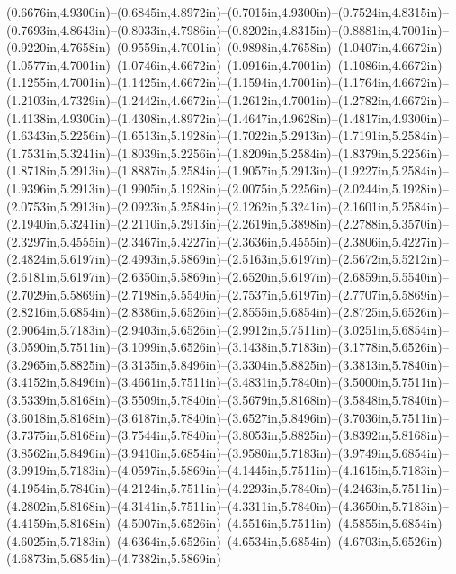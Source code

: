 (0.6676in,4.9300in)--(0.6845in,4.8972in)--(0.7015in,4.9300in)--(0.7524in,4.8315in)--(0.7693in,4.8643in)--(0.8033in,4.7986in)--(0.8202in,4.8315in)--(0.8881in,4.7001in)--(0.9220in,4.7658in)--(0.9559in,4.7001in)--(0.9898in,4.7658in)--(1.0407in,4.6672in)--(1.0577in,4.7001in)--(1.0746in,4.6672in)--(1.0916in,4.7001in)--(1.1086in,4.6672in)--(1.1255in,4.7001in)--(1.1425in,4.6672in)--(1.1594in,4.7001in)--(1.1764in,4.6672in)--(1.2103in,4.7329in)--(1.2442in,4.6672in)--(1.2612in,4.7001in)--(1.2782in,4.6672in)--(1.4138in,4.9300in)--(1.4308in,4.8972in)--(1.4647in,4.9628in)--(1.4817in,4.9300in)--(1.6343in,5.2256in)--(1.6513in,5.1928in)--(1.7022in,5.2913in)--(1.7191in,5.2584in)--(1.7531in,5.3241in)--(1.8039in,5.2256in)--(1.8209in,5.2584in)--(1.8379in,5.2256in)--(1.8718in,5.2913in)--(1.8887in,5.2584in)--(1.9057in,5.2913in)--(1.9227in,5.2584in)--(1.9396in,5.2913in)--(1.9905in,5.1928in)--(2.0075in,5.2256in)--(2.0244in,5.1928in)--(2.0753in,5.2913in)--(2.0923in,5.2584in)--(2.1262in,5.3241in)--(2.1601in,5.2584in)--(2.1940in,5.3241in)--(2.2110in,5.2913in)--(2.2619in,5.3898in)--(2.2788in,5.3570in)--(2.3297in,5.4555in)--(2.3467in,5.4227in)--(2.3636in,5.4555in)--(2.3806in,5.4227in)--(2.4824in,5.6197in)--(2.4993in,5.5869in)--(2.5163in,5.6197in)--(2.5672in,5.5212in)--(2.6181in,5.6197in)--(2.6350in,5.5869in)--(2.6520in,5.6197in)--(2.6859in,5.5540in)--(2.7029in,5.5869in)--(2.7198in,5.5540in)--(2.7537in,5.6197in)--(2.7707in,5.5869in)--(2.8216in,5.6854in)--(2.8386in,5.6526in)--(2.8555in,5.6854in)--(2.8725in,5.6526in)--(2.9064in,5.7183in)--(2.9403in,5.6526in)--(2.9912in,5.7511in)--(3.0251in,5.6854in)--(3.0590in,5.7511in)--(3.1099in,5.6526in)--(3.1438in,5.7183in)--(3.1778in,5.6526in)--(3.2965in,5.8825in)--(3.3135in,5.8496in)--(3.3304in,5.8825in)--(3.3813in,5.7840in)--(3.4152in,5.8496in)--(3.4661in,5.7511in)--(3.4831in,5.7840in)--(3.5000in,5.7511in)--(3.5339in,5.8168in)--(3.5509in,5.7840in)--(3.5679in,5.8168in)--(3.5848in,5.7840in)--(3.6018in,5.8168in)--(3.6187in,5.7840in)--(3.6527in,5.8496in)--(3.7036in,5.7511in)--(3.7375in,5.8168in)--(3.7544in,5.7840in)--(3.8053in,5.8825in)--(3.8392in,5.8168in)--(3.8562in,5.8496in)--(3.9410in,5.6854in)--(3.9580in,5.7183in)--(3.9749in,5.6854in)--(3.9919in,5.7183in)--(4.0597in,5.5869in)--(4.1445in,5.7511in)--(4.1615in,5.7183in)--(4.1954in,5.7840in)--(4.2124in,5.7511in)--(4.2293in,5.7840in)--(4.2463in,5.7511in)--(4.2802in,5.8168in)--(4.3141in,5.7511in)--(4.3311in,5.7840in)--(4.3650in,5.7183in)--(4.4159in,5.8168in)--(4.5007in,5.6526in)--(4.5516in,5.7511in)--(4.5855in,5.6854in)--(4.6025in,5.7183in)--(4.6364in,5.6526in)--(4.6534in,5.6854in)--(4.6703in,5.6526in)--(4.6873in,5.6854in)--(4.7382in,5.5869in)
